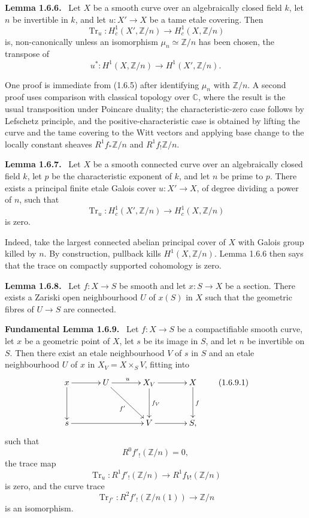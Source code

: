 \documentclass[12pt]{article}
\newcommand{\Zz}{\mathbb Z}
\newcommand{\C}{\mathbb C}
\newenvironment{statement}[1]{\par\medskip\noindent\textbf{#1.}\ }{\par\medskip}
\begin{document}
\begin{statement}{Lemma 1.6.6}
Let \(X\) be a smooth curve over an algebraically closed field \(k\), let \(n\) be invertible in \(k\), and let \(u:X'\to X\) be a tame etale covering. Then
\[
\operatorname{Tr}_{u}:H^1_c(X',\Zz/n)\to H^1_c(X,\Zz/n)
\]
is, non-canonically unless an isomorphism \(\mu_n\simeq\Zz/n\) has been chosen, the transpose of
\[
u^*:H^1(X,\Zz/n)\to H^1(X',\Zz/n).
\]
\end{statement}

One proof is immediate from (1.6.5) after identifying \(\mu_n\) with \(\Zz/n\). A second proof uses comparison with classical topology over \(\C\), where the result is the usual transposition under Poincare duality; the characteristic-zero case follows by Lefschetz principle, and the positive-characteristic case is obtained by lifting the curve and the tame covering to the Witt vectors and applying base change to the locally constant sheaves \(R^1f_*\Zz/n\) and \(R^1f_!\Zz/n\).

\begin{statement}{Lemma 1.6.7}
Let \(X\) be a smooth connected curve over an algebraically closed field \(k\), let \(p\) be the characteristic exponent of \(k\), and let \(n\) be prime to \(p\). There exists a principal finite etale Galois cover \(u:X'\to X\), of degree dividing a power of \(n\), such that
\[
\operatorname{Tr}_{u}:H^1_c(X',\Zz/n)\to H^1_c(X,\Zz/n)
\]
is zero.
\end{statement}

Indeed, take the largest connected abelian principal cover of \(X\) with Galois group killed by \(n\). By construction, pullback kills \(H^1(X,
\Zz/n)\). Lemma 1.6.6 then says that the trace on compactly supported cohomology is zero.

\begin{statement}{Lemma 1.6.8}
Let \(f:X\to S\) be smooth and let \(x:S\to X\) be a section. There exists a Zariski open neighbourhood \(U\) of \(x(S)\) in \(X\) such that the geometric fibres of \(U\to S\) are connected.
\end{statement}

\begin{statement}{Fundamental Lemma 1.6.9}
Let \(f:X\to S\) be a compactifiable smooth curve, let \(x\) be a geometric point of \(X\), let \(s\) be its image in \(S\), and let \(n\) be invertible on \(S\). Then there exist an etale neighbourhood \(V\) of \(s\) in \(S\) and an etale neighbourhood \(U\) of \(x\) in \(X_V=X\times_SV\), fitting into
\[
\xymatrix@R=1.2cm@C=1.2cm{
x\ar[r]\ar[d]&U\ar[r]^u\ar[rd]_{f'}&X_V\ar[r]\ar[d]^{f_V}&X\ar[d]^f\\
s\ar[rr]&&V\ar[r]&S,
}
\tag{1.6.9.1}
\]
such that
\[
R^0f'_!(\Zz/n)=0,
\]
the trace map
\[
\operatorname{Tr}_{u}:R^1f'_!(\Zz/n)\to R^1f_{V!}(\Zz/n)
\]
is zero, and the curve trace
\[
\operatorname{Tr}_{f'}:R^2f'_!(\Zz/n(1))\to\Zz/n
\]
is an isomorphism.
\end{statement}
\end{document}
